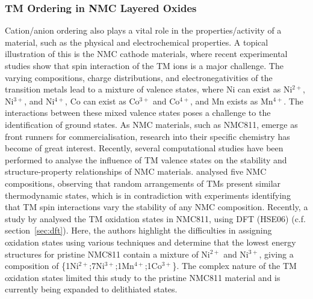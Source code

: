 \documentclass[../main.tex]{subfiles}
\begin{document}
\subsubsection{TM Ordering in NMC Layered Oxides}
\label{sec:TM_ordering_NMC}
Cation/anion ordering also plays a vital role in the properties/activity of a material, such as the physical and electrochemical properties. A topical illustration of this is the NMC cathode materials, where recent experimental studies show that spin interaction of the TM ions is a major challenge.\cite{duan2019insights, xiao2018insight} The varying compositions, charge distributions, and electronegativities of the transition metals lead to a mixture of valence states, where Ni can exist as Ni$^{2+}$, Ni$^{3+}$, and Ni$^{4+}$, Co can exist as Co$^{3+}$ and Co$^{4+}$, and Mn exists as Mn$^{4+}$.\cite{xiao2018insight} The interactions between these mixed valence states poses a challenge to the identification of ground states. As NMC materials, such as NMC811, emerge as front runners for commercialisation, research into their specific chemistry has become of great interest. Recently, several computational studies have been performed to analyse the influence of TM valence states on the stability and structure-property relationships of NMC materials.\cite{sun2017electronic,dixit2017origin, hoang2016defect,dixit2017unraveling} \citeauthor{sun2017electronic} analysed five NMC compositions, observing that random arrangements of TMs present similar thermodynamic states, which is in contradiction with experiments identifying that TM spin interactions vary the stability of any NMC composition.\cite{sun2017electronic} Recently, a study by \citeauthor{rana} analysed the TM oxidation states in NMC811, using DFT (HSE06) (c.f. section~\ref{sec:dft}). Here, the authors highlight the difficulties in assigning oxidation states using various techniques and determine that the lowest energy structures for pristine NMC811 contain a mixture of Ni$^{2+}$ and Ni$^{3+}$, giving a composition of \{1Ni$^{2+}$;7Ni$^{3+}$;1Mn$^{4+}$;1Co$^{3+}$\}.\cite{rana} The complex nature of the TM oxidation states limited this study to the pristine NMC811 material and is currently being expanded to delithiated states.
\end{document}
